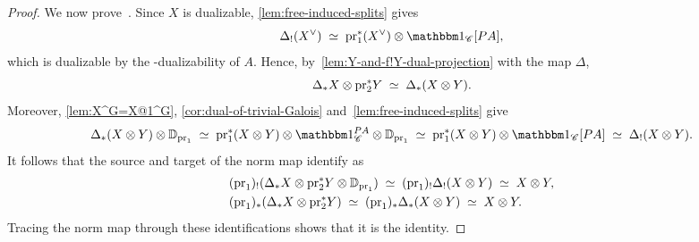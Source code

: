 \documentclass[english,svgnames,table]{article}
\begin{document}
\begin{proof}
        We now prove~. Since $X$ is dualizable, \cref{lem:free-induced-splits} gives
        \begin{equation*}
            \Delta_!(X\dual) \;\simeq\; \pr_1^*(X\dual)\otimes\ounit_{\cC}[\Path A],
        \end{equation*}
        which is dualizable by the \COB-dualizability of $A$. Hence, by~\cref{lem:Y-and-f!Y-dual-projection} with the map $\Delta$,
        \begin{equation*}
            \Delta_*X \otimes \mathrm{pr}_2^*Y \;\simeq\; \Delta_*(X \otimes Y).
        \end{equation*}
        Moreover, \cref{lem:X^G=X@1^G}, \cref{cor:dual-of-trivial-Galois} and~\cref{lem:free-induced-splits} give
        \begin{equation*}
            \Delta_*(X\otimes Y)\otimes\DD_{\pr_1} \;\simeq\; \pr_1^*(X\otimes Y)\otimes\ounit_{\cC}^{\Path A}\otimes\DD_{\pr_1} \;\simeq\; \pr_1^*(X\otimes Y)\otimes\ounit_{\cC}[\Path A] \;\simeq\; \Delta_!(X\otimes Y).
        \end{equation*}
        It follows that the source and target of the norm map identify as
        \begin{equation*}
            \begin{split}
                & (\mathrm{pr}_1)_!(\Delta_*X\otimes\mathrm{pr}_2^*Y\otimes\mathbb{D}_{\mathrm{pr}_1}) \;\simeq\; (\mathrm{pr}_1)_!\Delta_!(X\otimes Y) \;\simeq\; X\otimes Y, \\
                & (\mathrm{pr}_1)_*(\Delta_*X\otimes\mathrm{pr}_2^*Y) \;\simeq\; (\mathrm{pr}_1)_*\Delta_*(X\otimes Y) \;\simeq\; X\otimes Y.
            \end{split}
        \end{equation*}
        Tracing the norm map through these identifications shows that it is the identity.
    \end{proof}
\end{document}
